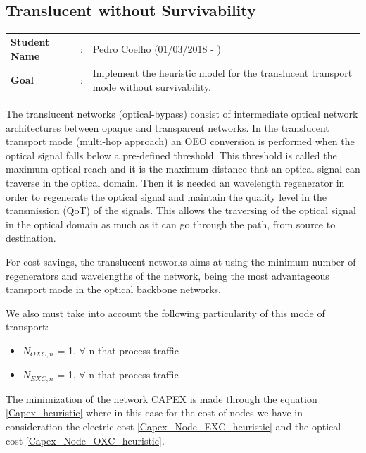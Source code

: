 \clearpage

\subsection{Translucent without Survivability}\label{heuristic_Transl_Survivability}
\begin{tcolorbox}	
\begin{tabular}{p{2.75cm} p{0.2cm} p{10.5cm}} 	
\textbf{Student Name}  &:& Pedro Coelho    (01/03/2018 - )\\
\textbf{Goal}          &:& Implement the heuristic model for the translucent transport mode without survivability.
\end{tabular}
\end{tcolorbox}

\vspace{11pt}
The translucent networks (optical-bypass) consist of intermediate optical network architectures between opaque and transparent networks. In the translucent transport mode (multi-hop approach) an OEO conversion is performed when the optical signal falls below a pre-defined threshold. This threshold is called the maximum optical reach and it is the maximum distance that an optical signal can traverse in the optical domain. Then it is needed an wavelength regenerator in order to regenerate the optical signal and maintain the quality level in the transmission (QoT) of the signals. This allows the traversing of the optical signal in the optical domain as much as it can go through the path, from source to destination.

For cost savings, the translucent networks aims at using the minimum number of regenerators and wavelengths of the network, being the most advantageous transport mode in the optical backbone networks.

We also must take into account the following particularity of this mode of transport:
\begin{itemize}
  \item $N_{OXC,n}$ = 1, \quad $\forall$ n that process traffic
  \item $N_{EXC,n}$ = 1, \quad $\forall$ n that process traffic
\end{itemize}

The minimization of the network CAPEX is made through the equation \ref{Capex_heuristic} where in this case for the cost of nodes we have in consideration the electric cost \ref{Capex_Node_EXC_heuristic} and the optical cost \ref{Capex_Node_OXC_heuristic}.\\

